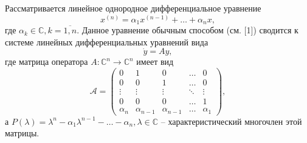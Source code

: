 Рассматривается линейное однородное дифференциальное уравнение
$$
	x^{(n)} = \alpha_{1}x^{(n-1)} + \ldots + \alpha_{n}x, 
$$
где $\alpha_{k} \in \mathbb{C}, k = \overline{1,n}$. Данное уравнение обычным способом (см. [1]) сводится к системе
линейных дифференциальных уравнений вида
$$
	\dot{y} = Ay,
$$
где матрица оператора $A: \mathbb{C}^n \to \mathbb{C}^n$ имеет вид
$$
	\mathcal{A} = \begin{pmatrix}
		0 & 1 & 0 & \dots & 0 \\
		0 & 0 & 1 & \dots & 0 \\
		\vdots & \vdots & \vdots & \ddots & \vdots \\
		0 & 0 & 0 & \dots & 1 \\
		\alpha_n & \alpha_{n-1} & \alpha_{n-1} & \dots & \alpha_1
	\end{pmatrix},
$$
а $P(\lambda) = \lambda^{n} - \alpha_{1}\lambda^{n-1} - \ldots - \alpha_{n}, \lambda \in \mathbb{C}$ -- характеристический многочлен этой матрицы.